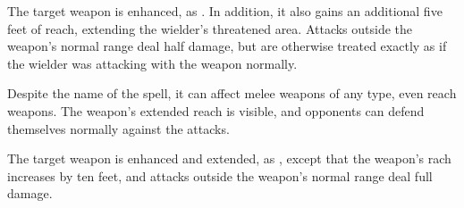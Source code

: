 \begin{spellheader}
    \begin{spelltargetinginfo}
    \end{spelltargetinginfo}
    \begin{spelleffects}
    \end{spelleffects}
\end{spellheader}
\begin{spellcontent}
    \spelleffect The target weapon is enhanced, as . In addition, it also gains an additional five feet of reach, extending the wielder's threatened area. Attacks outside the weapon's normal range deal half damage, but are otherwise treated exactly as if the wielder was attacking with the weapon normally.
    \spelldur{\durshort}
\end{spellcontent}
\begin{spellfooter}
    \spellnotes Despite the name of the spell, it can affect melee weapons of any type, even reach weapons. The weapon's extended reach is visible, and opponents can defend themselves normally against the attacks.
\end{spellfooter}

\begin{spellheader}
    \begin{spelltargetinginfo}
    \end{spelltargetinginfo}
    \begin{spelleffects}
    \end{spelleffects}
\end{spellheader}
\begin{spellcontent}
    \spelleffect The target weapon is enhanced and extended, as , except that the weapon's rach increases by ten feet, and attacks outside the weapon's normal range deal full damage.
    \spelldur{\durshort}
\end{spellcontent}
\begin{spellfooter}
\end{spellfooter}
